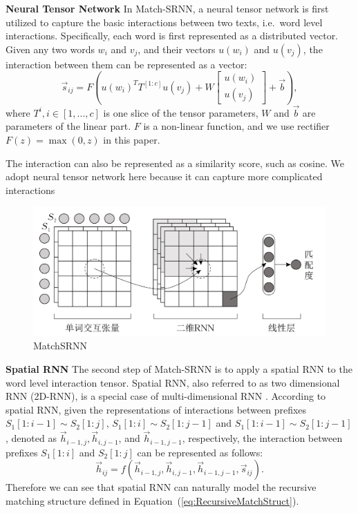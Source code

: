\textbf{Neural Tensor Network}
In Match-SRNN, a neural tensor network is first utilized to capture the basic interactions between two texts, i.e.~word level interactions.
Specifically, each word is first represented as a distributed vector. Given any two words $w_i$ and $v_j$, and their vectors $u(w_i)$ and $u(v_j)$, the interaction between them can be represented as a vector:
\begin{equation*}
\vec{s}_{ij}=F(u(w_i)^TT^{[1:c]}u(v_j)+W\begin{bmatrix}
		u(w_i)\\
		u(v_j)
	\end{bmatrix}+\vec{b}),
\end{equation*}
where $T^i, i\in[1,...,c]$ is one slice of the tensor parameters, $W$ and $\vec{b}$ are parameters of the linear part. $F$ is a non-linear function, and we use rectifier $F(z)=\max(0,z)$ in this paper.

The interaction can also be represented as a similarity score, such as cosine. We adopt neural tensor network here because it can capture more complicated interactions 

\begin{figure}[!htbp]
\vspace{1em}
\centering
  \includegraphics[width=0.9\linewidth]{figures/MatchSRNN.jpg}
  \caption{MatchSRNN}
  \label{fig:architecture}       %
\vspace{1em}
\end{figure}



\textbf{Spatial RNN}
The second step of Match-SRNN is to apply a spatial RNN to the word level interaction tensor. Spatial RNN, also referred to as two dimensional RNN (2D-RNN), is a special case of multi-dimensional RNN \cite{DBLP:journals/corr/abs-0705-2011,graves2009offline,theis2015generative}. According to spatial RNN, given the representations of interactions between prefixes $S_1[1{:}i{-}1]\!{\sim}\! S_2[1{:}j]$, $S_1[1{:}i]\!{\sim}\! S_2[1{:}j{-}1]$ and $S_1[1{:}i{-}1]\!{\sim}\! S_2[1{:}j{-}1]$, denoted as $\vec{h}_{i-1,j},\vec{h}_{i,j-1}$, and $\vec{h}_{i-1,j-1}$, respectively, the interaction between prefixes $S_1[1{:}i]$ and $S_2[1{:}j]$ can be represented as follows:
\begin{equation}
\label{eq:RecursiveMatchStruct}
\vec{h}_{ij}=f(\vec{h}_{i-1,j},\vec{h}_{i,j-1},\vec{h}_{i-1,j-1},\vec{s}_{ij}).
\end{equation}
Therefore we can see that spatial RNN can naturally model the recursive matching structure defined in Equation~(\ref{eq:RecursiveMatchStruct}).

